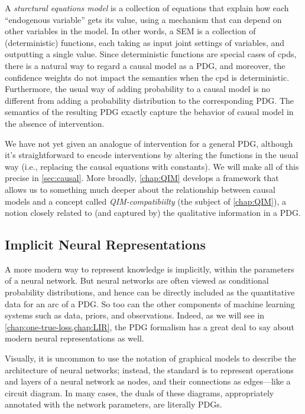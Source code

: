 A \emph{sturctural equations model} \cite{pearl2009causality} is a collection of equations that explain how each ``endogenous variable'' gets its value, using a mechanism that can depend on other variables in the model.
In other words, a SEM is a collection of (deterministic) functions, each taking as input joint settings of variables, and outputting a single value.
Since deterministic functions are special cases of cpds, there is a natural way to regard a causal model as a PDG, and moreover, the confidence weights do not impact the semantics when the cpd is deterministic.  
Furthermore, the usual way of adding probability to a causal model is no different from adding a probability distribution to the corresponding PDG. 
The semantics of the resulting PDG exactly capture the behavior of causal model in the absence of intervention.

We have not yet given an analogue of intervention for a general PDG, although it's straightforward to encode interventions by altering the functions in the usual way (i.e., replacing the causal equations with constants).
We will make all of this precise in \cref{sec:causal}.
More broadly, \cref{chap:QIM} develops a framework that allows us to something much deeper about the relationship between causal models and a concept called \emph{QIM-compatibiilty} (the subject of \cref{chap:QIM}), a notion closely related to (and captured by) the qualitative information in a PDG. 

\subsection{Implicit Neural Representations}

A more modern way to represent knowledge is implicitly, within the parameters of a neural network. 
But neural networks are often viewed as conditional probability distributions, and hence can be directly included as the quantitative data for an arc of a PDG.
So too can the other components of machine learning systems such as data, priors, and observations. 
Indeed, as we will see in \cref{chap:one-true-loss,chap:LIR}, the PDG formalism has a great deal to say about modern neural representations as well.

Visually, it is uncommon to use the notation of graphical models to describe the architecture of neural networks; instead, the standard is to represent operations and layers of a neural network as nodes, and their connections as edges---like a circuit diagram.
In many cases, the duals of these diagrams, appropriately annotated with the network parameters, are literally PDGs.


